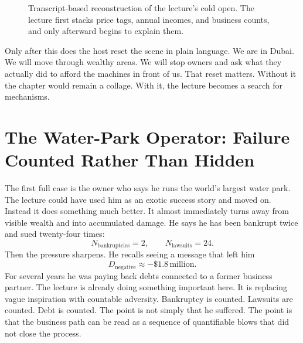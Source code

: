 \begin{figure}[h]
\centering
{}
\caption{Transcript-based reconstruction of the lecture's cold open. The lecture first stacks price tags, annual incomes, and business counts, and only afterward begins to explain them.}
\end{figure}

Only after this does the host reset the scene in plain language. We are in Dubai. We will move through wealthy areas. We will stop owners and ask what they actually did to afford the machines in front of us. That reset matters. Without it the chapter would remain a collage. With it, the lecture becomes a search for mechanisms.

\section{The Water-Park Operator: Failure Counted Rather Than Hidden}

The first full case is the owner who says he runs the world's largest water park. The lecture could have used him as an exotic success story and moved on. Instead it does something much better. It almost immediately turns away from visible wealth and into accumulated damage. He says he has been bankrupt twice and sued twenty-four times:
\begin{equation}
N_{\text{bankruptcies}}=2,
\qquad
N_{\text{lawsuits}}=24.
\end{equation}
Then the pressure sharpens. He recalls seeing a message that left him
\begin{equation}
D_{\text{negative}}\approx -\$1.8\,\text{million}.
\end{equation}
For several years he was paying back debts connected to a former business partner. The lecture is already doing something important here. It is replacing vague inspiration with countable adversity. Bankruptcy is counted. Lawsuits are counted. Debt is counted. The point is not simply that he suffered. The point is that the business path can be read as a sequence of quantifiable blows that did not close the process.

